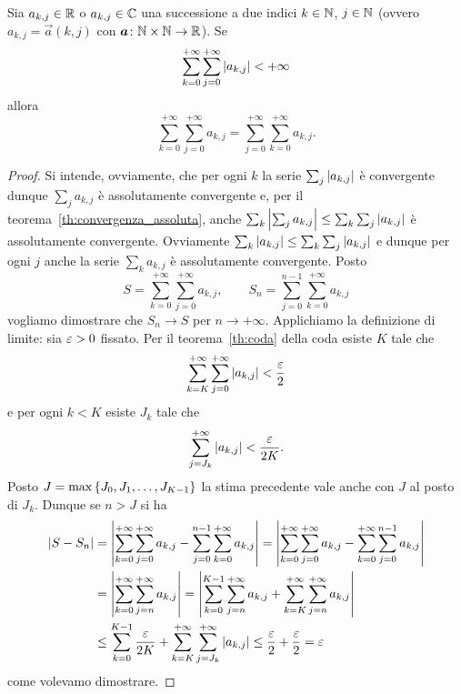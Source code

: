 \begin{theorem}
  \label{th:scambio_somma}
Sia $a_{k,j}\in {\mathbb R}$ o $a_{k,j}\in {\mathbb C}$ una successione a due indici $k\in {\mathbb N}$, $j\in {\mathbb N}$ 
(ovvero $a_{k,j}=\vec a(k,j)$ con $\boldsymbol a \colon {\mathbb N}\times{\mathbb N}\to {\mathbb R}$).
Se 
\[
  \sum_{k=0}^{+\infty}\sum_{j=0}^{+\infty}{\left|a_{k,j}\right|}<+\infty  
\]
allora
\begin{equation}\label{eq:scambio_somma}
  \sum_{k=0}^{+\infty} \sum_{j=0}^{+\infty} a_{k,j}
  = \sum_{j=0}^{+\infty} \sum_{k=0}^{+\infty} a_{k,j}.
\end{equation}
\end{theorem}
%
\begin{proof}
Si intende, ovviamente, che per ogni $k$ 
la serie $\sum_j {\left|a_{k,j}\right|}$ è convergente
dunque $\sum_j a_{k,j}$ è assolutamente convergente
e, per il teorema~\ref{th:convergenza_assoluta}, 
anche $\sum_k {\left|\sum_j a_{k,j}\right|} 
\le \sum_k \sum_j {\left|a_{k,j}\right|}$
è assolutamente convergente.
Ovviamente 
$\sum_k {\left|a_{k,j}\right|} \le \sum_k \sum_j {\left|a_{k,j}\right|}$
e dunque per ogni $j$ anche la serie 
$\sum_k a_{k,j}$ è assolutamente convergente.
Posto
\[
S = \sum_{k=0}^{+\infty}\sum_{j=0}^{+\infty} a_{k,j},
\qquad
S_n = \sum_{j=0}^{n-1}\sum_{k=0}^{+\infty} a_{k,j}  
\]
vogliamo dimostrare che $S_n \to S$
per $n\to +\infty$. 
Applichiamo la definizione di limite:
sia $\varepsilon>0$ fissato.
Per il teorema~\ref{th:coda} della coda 
esiste $K$ tale che 
\[
  \sum_{k=K}^{+\infty} \sum_{j=0}^{+\infty} {\left|a_{k,j}\right|}<\frac {\varepsilon} 2
\]
e per ogni $k<K$ esiste $J_k$ tale che 
\[
  \sum_{j=J_k}^{+\infty} {\left|a_{k,j}\right|} < \frac{\varepsilon}{2K}.  
\]
Posto $J=\max{\left\{ J_0,J_1, \dots, J_{K-1} \right\}}$
la stima precedente vale anche con $J$ al posto di $J_k$.
Dunque se $n>J$ si ha 
\begin{align*}
  {\left|S-S_n\right|}
  &= {\left|\sum_{k=0}^{+\infty}\sum_{j=0}^{+\infty}a_{k,j} 
  - \sum_{j=0}^{n-1}\sum_{k=0}^{+\infty}a_{k,j}\right|}
  = 
  {\left|\sum_{k=0}^{+\infty}\sum_{j=0}^{+\infty}a_{k,j} 
  - \sum_{k=0}^{+\infty}\sum_{j=0}^{n-1}a_{k,j}\right|}\\
  &=
  {\left|\sum_{k=0}^{+\infty}\sum_{j=n}^{+\infty}a_{k,j} \right|}
  = {\left|\sum_{k=0}^{K-1}\sum_{j=n}^{+\infty} a_{k,j}
   + \sum_{k=K}^{+\infty}\sum_{j=n}^{+\infty} a_{k,j}\right|}\\
  &\le \sum_{k=0}^{K-1}\frac{\varepsilon}{2K}
   + \sum_{k=K}^{+\infty}\sum_{j=J_k}^{+\infty}{\left|a_{k,j}\right|}
  \le \frac {\varepsilon} 2 + \frac {\varepsilon} 2 = \varepsilon
\end{align*}
come volevamo dimostrare.
\end{proof}

